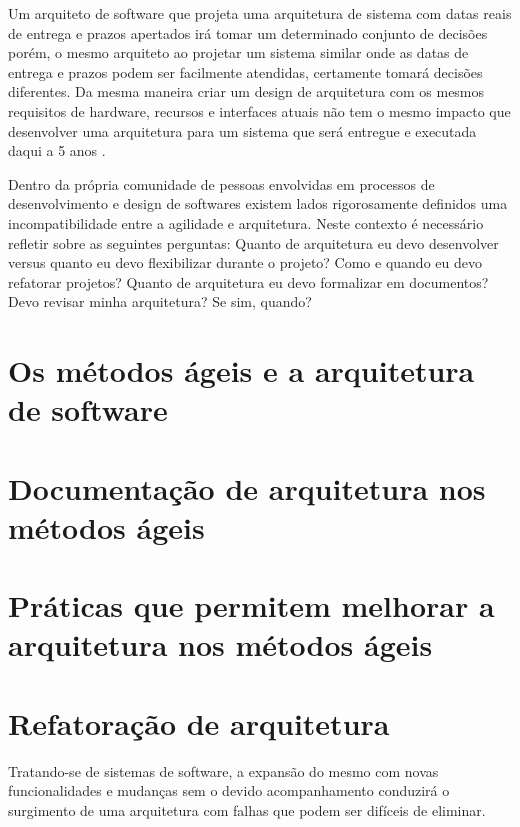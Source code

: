 Um arquiteto de software que projeta uma arquitetura de sistema com datas reais de entrega e prazos apertados irá tomar um determinado conjunto de decisões porém, o mesmo arquiteto ao projetar um sistema similar onde as datas de entrega e prazos podem ser facilmente atendidas, certamente tomará decisões diferentes. Da mesma maneira criar um design de arquitetura com os mesmos requisitos de hardware, recursos e interfaces atuais não tem o mesmo impacto que desenvolver uma arquitetura para um sistema que será entregue e executada daqui a 5 anos \cite{bass2007software}.

Dentro da própria comunidade de pessoas envolvidas em processos de desenvolvimento e design de softwares existem lados rigorosamente definidos  uma incompatibilidade entre a agilidade e arquitetura. Neste contexto é necessário refletir sobre as seguintes perguntas: Quanto de arquitetura eu devo desenvolver versus quanto eu devo flexibilizar durante o projeto? Como e quando eu devo refatorar projetos? Quanto de arquitetura eu devo formalizar em documentos? Devo revisar minha arquitetura? Se sim, quando?
\cite{babar2013agile}

\section{Os métodos ágeis e a arquitetura de software}



\section{Documentação de arquitetura nos métodos ágeis}

\section{Práticas que permitem melhorar a arquitetura nos métodos ágeis}

\section{Refatoração de arquitetura}

Tratando-se de sistemas de software, a expansão do mesmo com novas funcionalidades e mudanças sem o devido acompanhamento conduzirá o surgimento de uma arquitetura com falhas que podem ser difíceis de eliminar. 

